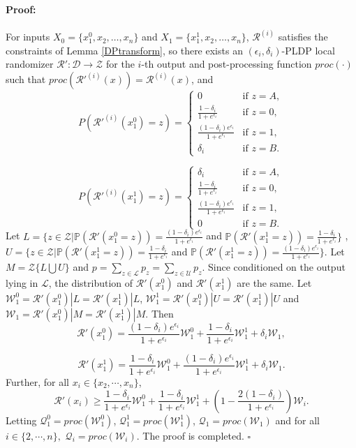 \documentclass[letterpaper]{article} %
\newenvironment{proof}{\paragraph{Proof:}}{\hfill$\square$}
\begin{document}
\begin{proof}
For inputs $X_0 = \{x_1^0, x_2, \ldots, x_n\}$ and $X_1 = \{x^1_1, x_2, \ldots, x_n\}$, $\mathcal{R}^{(i)}$ satisfies the constraints of Lemma \ref{DPtransform},
so there exists an
$(\epsilon_i,\delta_i)$-PLDP local randomizer $\mathcal{R'}: \mathcal{D} \rightarrow \mathcal{Z}$ for the $i$-th output and post-processing function $proc(\cdot)$ such that $proc(\mathcal{R'}^{(i)}(x)) = \mathcal{R}^{(i)}(x)$, and
$$
P(\mathcal{R'}^{(i)}(x_1^0)=z) = \left\{
    \begin{array}{ll}
        0 & \mbox{if } z=A, \\
        \frac{1-\delta_i}{1+e^{\epsilon_i}} & \mbox{if } z = 0, \\
        \frac{(1-\delta_i)e^{\epsilon_i}}{1+e^{\epsilon_i}} & \mbox{if } z = 1, \\
        \delta_i & \mbox{if } z = B.
    \end{array}
\right.
$$

$$
P(\mathcal{R'}^{(i)}(x_1^1)=z) = \left\{
    \begin{array}{ll}
        \delta_i & \mbox{if } z=A, \\
        \frac{1-\delta_i}{1+e^{\epsilon_i}} & \mbox{if } z = 0, \\
        \frac{(1-\delta_i)e^{\epsilon_i}}{1+e^{\epsilon_i}} & \mbox{if } z = 1, \\
        0 & \mbox{if } z = B.
    \end{array}
\right.
$$
Let $L = \{z\in \mathcal{Z}|\mathbb{P}(\mathcal{R'}(x_1^0=z))=\frac{(1-\delta_i)e^{\epsilon_i}}{1+e^{\epsilon_i}}$ and $\mathbb{P}(\mathcal{R'}(x_1^1=z))=\frac{1-\delta_i}{1+e^{\epsilon_i}}\}$ ,
$U = \{z\in \mathcal{Z}|\mathbb{P}(\mathcal{R'}(x_1^1=z))=\frac{1-\delta_i}{1+e^{\epsilon_i}}$ and
$\mathbb{P}(\mathcal{R'}(x_1^1=z))=\frac{(1-\delta_i)e^{\epsilon_i}}{1+e^{\epsilon_i}}\}$. Let $M = \mathcal{Z}\{L\bigcup U\}$ and
$p = \sum_{z \in \mathcal{L}} p_z = \sum_{z \in \mathcal{U}} p_z.$ Since conditioned on the output lying in $\mathcal{L}$, the distribution of
$\mathcal{R}'(x_1^0)$ and $\mathcal{R}'(x_1^1)$ are the same. Let $\mathcal{W}_1^0 = \mathcal{R}'(x_1^0) |L = \mathcal{R}'(x_1^1)|L$,
$\mathcal{W}^1_1 = \mathcal{R}'(x_1^0)|U = \mathcal{R}'(x_1^1)|U$ and $\mathcal{W}_1 = \mathcal{R}'(x_1^0)|M =\mathcal{R}'(x_1^1)|M.$ Then
$$
\mathcal{R}'(x_1^0) = \frac{(1-\delta_i)e^{\epsilon_i}}{1+e^{\epsilon_i}}\mathcal{W}_1^0+\frac{1-\delta_i}{1+e^{\epsilon_i}}\mathcal{W}_1^1 + \delta_i \mathcal{W}_1,
$$

$$
\mathcal{R}'(x_1^1) = \frac{1-\delta_i}{1+e^{\epsilon_i}}\mathcal{W}_1^0+\frac{(1-\delta_i)e^{\epsilon_i}}{1+e^{\epsilon_i}}\mathcal{W}_1^1 + \delta_i \mathcal{W}_1.
$$
Further, for all $x_i \in \{x_2,\cdots, x_n\}$,
$$\mathcal{R}'(x_i) \ge \frac{1-\delta_i}{1+e^{\epsilon_i}}\mathcal{W}_1^0 + \frac{1-\delta_i}{1+e^{\epsilon_i}}\mathcal{W}_1^1 + \left(1-\frac{2(1-\delta_i)}{1+e^{\epsilon_i}}\right)\mathcal{W}_i.$$
Letting $\mathcal{Q}_1^0 = proc(\mathcal{W}_1^0)$, $\mathcal{Q}_1^1 = proc(\mathcal{W}_1^1)$, $\mathcal{Q}_1 = proc(\mathcal{W}_1)$ and for
all $i \in \{2, \cdots, n\},$ $\mathcal{Q}_i = proc(\mathcal{W}_i)$. The proof is completed.
\end{proof}
\end{document}
